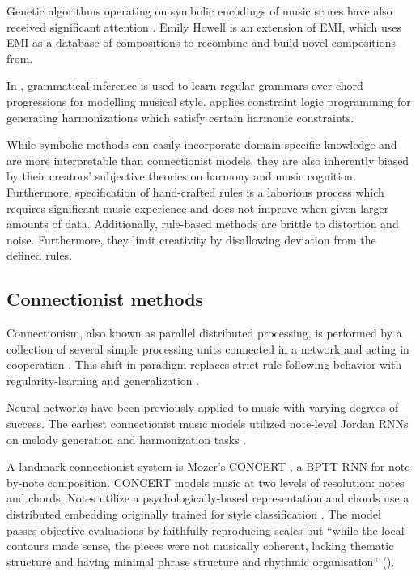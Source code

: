 Genetic algorithms operating on symbolic encodings of music scores have also
received significant attention \citet{weinberg2007real,cope2010recombinant}.
Emily Howell\citep{cope2005computer} is an extension of EMI, which uses EMI as
a database of compositions to recombine and build novel compositions
from\cite{cope2010recombinant}.

In \citet{cruz1998learning}, grammatical inference is used to learn regular
grammars over chord progressions for modelling musical style.
\citet{tsang1991harmonizing} applies constraint logic programming for
generating harmonizations which satisfy certain harmonic constraints.

While symbolic methods can easily incorporate domain-specific knowledge and are
more interpretable than connectionist models, they are also inherently biased
by their creators' subjective theories on harmony and music cognition.
Furthermore, specification of hand-crafted rules is a laborious process which
requires significant music experience and does not improve when given larger
amounts of data. Additionally, rule-based methods are brittle to distortion and
noise. Furthermore, they limit creativity by disallowing deviation from the
defined rules.

\subsection{Connectionist methods}

Connectionism, also known as parallel distributed processing, is performed by a
collection of several simple processing units connected in a network and acting
in cooperation \citep{pdp1986parallel}. This shift in paradigm replaces strict
rule-following behavior with regularity-learning and generalization
\citep{dolson1989machine}.

Neural networks have been previously applied to music with varying degrees of
success\citep{griffith1999musical}. The earliest connectionist music models
utilized note-level Jordan RNNs on melody generation and harmonization tasks
\citep{todd1988sequential,todd1989connectionist,bharucha1989modeling}.

A landmark connectionist system is Mozer's CONCERT \citep{mozer1994neural}, a
BPTT RNN for note-by-note composition. CONCERT models music at two
levels of resolution: notes and chords. Notes utilize a psychologically-based
representation \citep{shepard1982geometrical} and chords use a distributed
embedding originally trained for style classification
\citep{laden1989representation}. The model passes objective evaluations by
faithfully reproducing scales but ``while the local contours made sense, the
pieces were not musically coherent, lacking thematic structure and having
minimal phrase structure and rhythmic organisation`` (\citet{mozer1994neural}).

